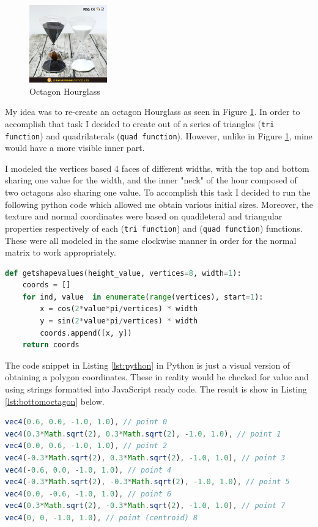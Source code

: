 \documentclass[12pt,a4paper]{article}
\begin{document}
\begin{figure}
\centering
\includegraphics[width=0.3\textwidth, angle = 0]{img/hourglass.png}
\caption{Octagon Hourglass \cite{hourglass}}
\label{img:hourglass}
\end{figure}
My idea was to re-create an octagon Hourglass as seen in Figure \ref{img:hourglass}. In order to accomplish that task I decided to create out of a series of triangles (\texttt{tri function{}}) and quadrilaterals (\texttt{quad function{}}). However, unlike in Figure \ref{img:hourglass}, mine would have a more visible inner part.  

I modeled the vertices based 4 faces of different widths, with the top and bottom sharing one value for the width, and the inner "neck" of the hour composed of two octagons also sharing one value. To accomplish this task I decided to run the following python code which allowed me obtain various initial sizes. Moreover, the texture and normal coordinates were based on quadileteral and triangular properties respectively of each  (\texttt{tri function{}}) and (\texttt{quad function{}}) functions. These were all modeled in the same clockwise manner in order for the normal matrix to work appropriately.
\clearpage
\begin{lstlisting}[caption={Getting values for the vertices},label={lst:python},language=python]
def getshapevalues(height_value, vertices=8, width=1):
    coords = []
    for ind, value  in enumerate(range(vertices), start=1):
        x = cos(2*value*pi/vertices) * width
        y = sin(2*value*pi/vertices) * width
        coords.append([x, y])
    return coords
\end{lstlisting}
The  code snippet in Listing \ref{lst:python} in Python is just a visual version of obtaining a polygon coordinates. These in reality would be checked for value and using strings formatted into JavaScript ready code. The result is show in Listing \ref{lst:bottomoctagon} below. 

\begin{lstlisting}[caption={Bottom Octagon example vertex defintions},label={lst:bottomoctagon},language=JavaScript]
vec4(0.6, 0.0, -1.0, 1.0), // point 0
vec4(0.3*Math.sqrt(2), 0.3*Math.sqrt(2), -1.0, 1.0), // point 1
vec4(0.0, 0.6, -1.0, 1.0), // point 2
vec4(-0.3*Math.sqrt(2), 0.3*Math.sqrt(2), -1.0, 1.0), // point 3
vec4(-0.6, 0.0, -1.0, 1.0), // point 4
vec4(-0.3*Math.sqrt(2), -0.3*Math.sqrt(2), -1.0, 1.0), // point 5
vec4(0.0, -0.6, -1.0, 1.0), // point 6
vec4(0.3*Math.sqrt(2), -0.3*Math.sqrt(2), -1.0, 1.0), // point 7
vec4(0, 0, -1.0, 1.0), // point (centroid) 8
\end{lstlisting}
\end{document}
